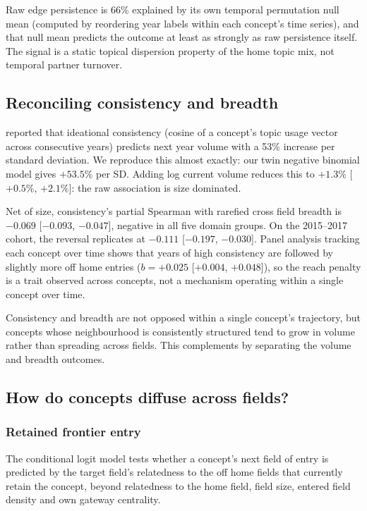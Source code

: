 \documentclass[11pt,letterpaper]{article}
\begin{document}
Raw edge persistence is 66\% explained by its own temporal permutation null mean
(computed by reordering year labels within each concept's time series), and that null mean predicts the
outcome at least as strongly as raw
persistence itself. The signal is a static topical dispersion property of the
home topic mix, not temporal partner turnover.

\subsection{Reconciling consistency and breadth}

\citet{Cheng2023} reported that ideational consistency (cosine of a concept's
topic usage vector across consecutive years) predicts next year volume with
a 53\% increase per standard deviation. We reproduce this almost exactly: our
twin negative binomial model gives $+53.5\%$ per SD. Adding log current volume
reduces this to $+1.3\%$ [$+0.5\%$, $+2.1\%$]: the raw association is
size dominated.

Net of size, consistency's partial Spearman with rarefied cross field breadth is
$-0.069$ [$-0.093$, $-0.047$], negative in all five domain groups. On the
2015--2017 cohort, the reversal replicates at $-0.111$ [$-0.197$, $-0.030$].
Panel analysis tracking each concept over time shows that years of high
consistency are followed by slightly more off home entries ($b = +0.025$
[$+0.004$, $+0.048$]), so the reach penalty is a trait observed across concepts, not a mechanism operating within a single
concept over time.

Consistency and breadth are not opposed within a single concept's trajectory, but
concepts whose neighbourhood is consistently structured tend to grow in volume
rather than spreading across fields. This complements \citet{Cheng2023} by
separating the volume and breadth outcomes.

\subsection{How do concepts diffuse across fields?}

\subsubsection{Retained frontier entry}

The conditional logit model tests whether a concept's next field of entry is
predicted by the target field's relatedness to the off home fields that
currently retain the concept, beyond relatedness to the home field, field size,
entered field density and own gateway centrality.
\end{document}
